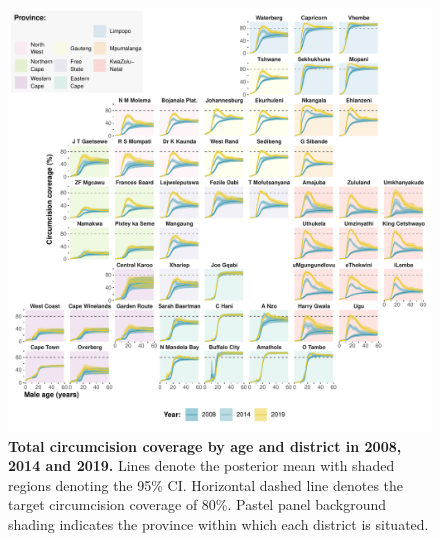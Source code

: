 \documentclass{article}
\begin{document}
\begin{figure}[H]
  \centering
  \includegraphics[width = \linewidth]{Figures/paper/Figure5.pdf}
  \caption{{\bf Total circumcision coverage by age and district in 2008, 2014 and 2019.} Lines denote the posterior mean with shaded regions denoting the 95\% CI. Horizontal dashed line denotes the target circumcision coverage of 80\%. Pastel panel background shading indicates the province within which each district is situated.}
  \label{fig::districtsingleageprev}
\end{figure}

\end{document}
